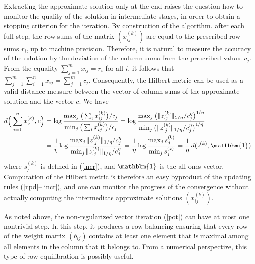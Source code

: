 \documentclass{article}
\newcommand{\one}{\mathbbm{1}}
\theoremstyle{definition}
\begin{document}
Extracting the approximate solution only at the end raises the question how to monitor the quality of the solution in intermediate stages, in order to obtain a stopping criterion for the iteration. By construction of the algorithm, after each full step,
the row sums of the matrix $(x_{ij}^{(k)})$ are equal to the prescribed row sums $r_i$, up to machine precision. Therefore, it
is natural to measure the accuracy of the solution by the deviation of the column sums from the prescribed
values $c_j$. From the equality $\sum_{j=1}^m x_{ij} = r_i$ for all $i$, it follows that
$\sum_{j=1}^m \sum_{i=1}^n x_{ij} = \sum_{j=1}^m c_j$.
Consequently, the Hilbert metric can be used as a valid distance measure between the vector of column sums
of the approximate solution and the vector $c$. We have
\begin{align}
d\Big(\sum_{i=1}^n x^{(k)}_{i\cdot},c \Big) & = \log \frac{\max_j \big(\sum_i x^{(k)}_{ij}\big)/c_j}{\min_j \big(\sum_i x^{(k)}_{ij}\big)/c_j} = \log \frac{\max_j \big(\| z^{(k)}_{\cdot j} \|_{1/\eta} /c_j^{\eta}\big)^{1/\eta}}{\min_j \big(\| z^{(k)}_{\cdot j} \|_{1/\eta} /c_j^{\eta}\big)^{1/\eta}} \nonumber \\
& = \frac{1}{\eta} \log \frac{\max_j \| z^{(k)}_{\cdot j} \|_{1/\eta} /c_j^{\eta}}{\min_j \| z^{(k)}_{\cdot j} \|_{1/\eta}/ c_j^{\eta}} = \frac{1}{\eta} \log \frac{\max_j s_j^{(k)}}{\min_j s_j^{(k)}} \label{critval} = \frac{1}{\eta} \, d(s^{(k)},\one)
\end{align}
where $s_j^{(k)}$ is defined in (\ref{incr}), and $\one$ is the all-ones vector. Computation of the Hilbert metric is therefore an easy byproduct of the updating rules (\ref{upd}--\ref{incr}), and one can monitor the progress of the convergence without actually computing the intermediate approximate solutions $(x_{ij}^{(k)})$.

As noted above, the non-regularized vector iteration (\ref{pot}) can have at most one nontrivial step. In this step,
it produces a row balancing ensuring that every row of the weight matrix $(b_{ij})$ contains at least one element that is
maximal among all elements in the column that it belongs to. From a numerical perspective, this type of row equilibration is
possibly useful.
\end{document}
